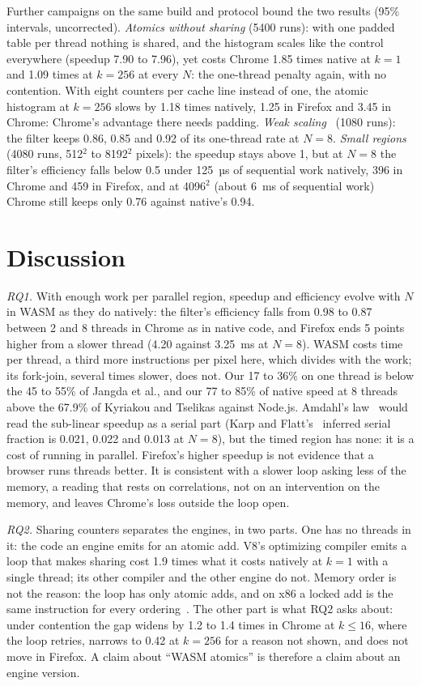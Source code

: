 \documentclass[sigplan]{acmart}
\begin{document}
Further campaigns on the same build and protocol bound the two results
(95\% intervals, uncorrected). \emph{Atomics without sharing} (5400 runs):
with one padded table per thread nothing is shared, and the histogram
scales like the control everywhere (speedup 7.90 to 7.96), yet costs Chrome
1.85 times native at $k=1$ and 1.09 times at $k=256$ at every $N$: the
one-thread penalty again, with no contention. With eight counters per cache
line instead of one, the atomic histogram at $k=256$ slows by 1.18 times
natively, 1.25 in Firefox and 3.45 in Chrome: Chrome's advantage there
needs padding. \emph{Weak scaling}~\cite{gustafson1988} (1080 runs): the
filter keeps 0.86, 0.85 and 0.92 of its one-thread rate at $N=8$. \emph{Small regions} (4080
runs, 512$^2$ to 8192$^2$ pixels): the speedup stays above 1, but at $N=8$
the filter's efficiency falls below 0.5 under 125~µs of sequential work
natively, 396 in Chrome and 459 in Firefox, and at 4096$^2$ (about 6~ms of
sequential work) Chrome still keeps only 0.76 against native's 0.94.

\section{Discussion}

\emph{RQ1.} With enough work per parallel region, speedup and efficiency
evolve with $N$ in WASM as they do natively: the filter's efficiency falls
from 0.98 to 0.87 between 2 and 8 threads in Chrome as in native code, and
Firefox ends 5 points higher from a slower thread (4.20 against 3.25~ms at
$N=8$). WASM costs time per thread, a third more instructions per pixel
here, which divides with the work; its fork-join, several times slower,
does not. Our 17 to 36\% on one thread is below the 45 to 55\% of Jangda et
al., and our 77 to 85\% of native speed at 8 threads above the 67.9\% of
Kyriakou and Tselikas against Node.js. Amdahl's
law~\cite{amdahl1967} would read the sub-linear speedup as a serial part
(Karp and Flatt's~\cite{karp1990} inferred serial fraction is 0.021, 0.022
and 0.013 at $N=8$), but the timed region has none: it is a cost of running
in parallel. Firefox's higher speedup is not evidence that a browser runs
threads better. It is consistent with a slower loop asking less of the
memory, a reading that rests on correlations, not on an intervention on the
memory, and leaves Chrome's loss outside the loop open.

\emph{RQ2.} Sharing counters separates the engines, in two parts. One has
no threads in it: the code an engine emits for an atomic add. V8's
optimizing compiler emits a loop that makes sharing cost 1.9 times what it
costs natively at $k=1$ with a single thread; its other compiler and the
other engine do not. Memory order is not the reason: the loop has only atomic
adds, and on x86 a locked add is the same instruction for every
ordering~\cite{schweizer2015}. The other part is what RQ2 asks about: under
contention the gap widens by 1.2 to 1.4 times in Chrome at $k \le 16$,
where the loop retries, narrows to 0.42 at $k=256$ for a reason not shown,
and does not move in Firefox. A claim about ``WASM atomics'' is therefore a
claim about an engine version.
\end{document}
